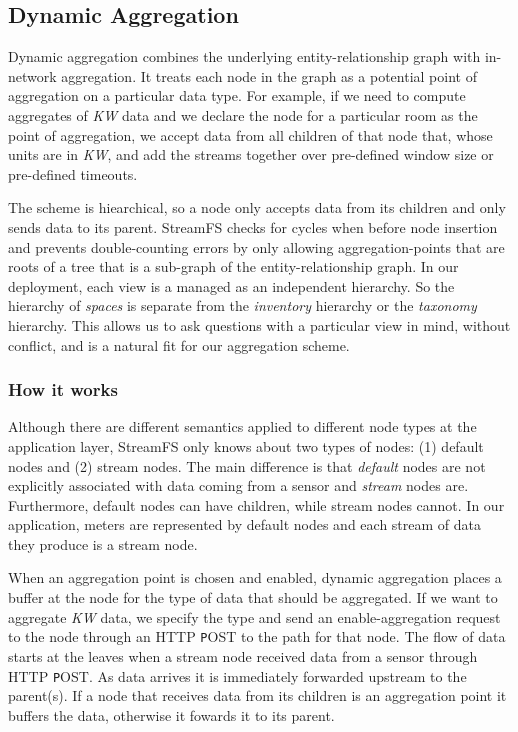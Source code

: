 \subsection{Dynamic Aggregation}
\label{sec:dynagg}
Dynamic aggregation combines the underlying entity-relationship graph with in-network aggregation.  It treats
each node in the graph as a potential point of aggregation on a particular data type.  For example,
if we need to compute aggregates of \emph{KW} data and we declare the node for a particular room as
the point of aggregation, we accept data from all children of that node that, whose units are in \emph{KW},
and add the streams together over pre-defined window size or pre-defined timeouts.

The scheme is hiearchical, so a node only accepts data from its children and only sends data to its parent.
StreamFS checks for cycles when before node insertion and prevents double-counting errors by only allowing 
aggregation-points that are roots of a tree that is a sub-graph of the entity-relationship graph.  In our deployment,
each view is a managed as an independent hierarchy.  So the hierarchy of \emph{spaces} is separate from
the \emph{inventory} hierarchy or the \emph{taxonomy} hierarchy.  This allows us to ask questions with a particular
view in mind, without conflict, and is a natural fit for our aggregation scheme.

\subsubsection{How it works}
Although there are different semantics applied to different node types at the application layer, StreamFS only knows
about two types of nodes: (1) default nodes and (2) stream nodes.  The main difference is that \emph{default} nodes
are not explicitly associated with data coming from a sensor and \emph{stream} nodes are.  Furthermore, default
nodes can have children, while stream nodes cannot.  In our application, meters are represented by default nodes
and each stream of data they produce is a stream node.

When an aggregation point is chosen and enabled, dynamic aggregation places a buffer at the node for the type
of data that should be aggregated.  If we want to aggregate \emph{KW} data, we specify the type and send an enable-aggregation
request to the node through an HTTP {\texttt POST} to the path for that node.  The flow of data starts at the leaves when
a stream node received data from a sensor through HTTP {\texttt POST}.  As data arrives it is immediately
forwarded upstream to the parent(s).  If a node that receives data from its children is an aggregation point it buffers
the data, otherwise it fowards it to its parent.

